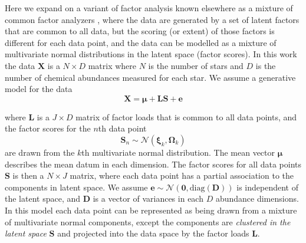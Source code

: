 \documentclass[twocolumn]{aastex62}
\newcommand{\vect}[1]{\boldsymbol{\mathbf{#1}}}
\renewcommand{\vec}[1]{\vect{#1}}
\newcommand{\vecdataunscaled}{\vec{X}}
\newcommand{\factorloads}{\textbf{L}}
\newcommand{\factorscores}{\textbf{S}}
\newcommand{\specificvariance}{\vec{D}}
\newcommand{\NumData}{N}
\newcommand{\NumDimensions}{D}
\newcommand{\numdata}{n}
\newcommand{\NumLatentFactors}{J}
\newcommand{\numcomponents}{k}
\begin{document}
Here we expand on a variant of factor analysis known elsewhere as a mixture of common 
factor analyzers \citep{Baek:2010}, where the data are generated by a set of 
latent factors that are common to all data, but the scoring (or extent) of those
factors is different for each data point, and the data can be modelled as a
mixture of multivariate normal distributions in the latent space (factor scores).
In this work the data $\vecdataunscaled$ is a 
$\NumData \times \NumDimensions$ matrix where $\NumData$ is the number of 
stars and $\NumDimensions$ is the number of chemical abundances measured 
for each star. We assume a generative model for the data 
\begin{equation}
	\vecdataunscaled = \vec\mu + \factorloads\factorscores + \vec{e}
	\label{eq:generative-model}
\end{equation}

\noindent{}where $\factorloads$ is a $\NumLatentFactors \times \NumDimensions$ 
matrix of factor loads that is common to all data points, and the factor scores 
for the $\numdata$th data point
\begin{equation}
	\factorscores_\numdata \sim \mathcal{N}(\vec\xi_\numcomponents, \vec\Omega_\numcomponents)
\end{equation}
\noindent{}are drawn from the $\numcomponents$th multivariate normal distribution.
The mean vector $\vec\mu$ describes the mean datum in each dimension.
The factor scores for all data points $\factorscores$ is then a 
$\NumData \times \NumLatentFactors$ matrix, where each data point has a partial
association to the components in latent space. 
We assume $\vec{e} \sim \mathcal{N}\left(\vec{0}, \textrm{diag}(\specificvariance)\right)$
is independent of the latent space, and $\specificvariance$ is a
vector of variances in each $\NumDimensions$ abundance dimensions.
In this model each data point can be represented as being drawn
from a mixture of multivariate normal components, except the components
are \emph{clustered in the latent space} $\factorscores$ and projected
into the data space by the factor loads $\factorloads$. 
\end{document}
